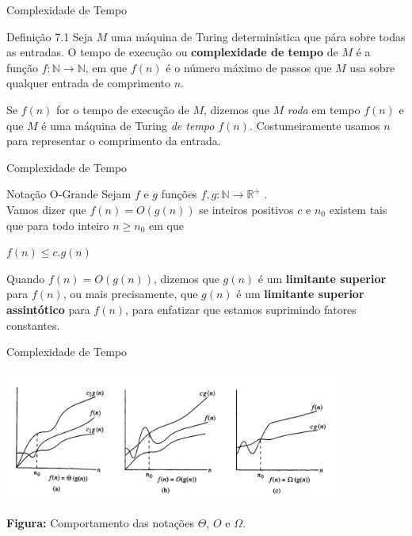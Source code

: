 \documentclass[xcolor=dvipsnames,table]{beamer}
\begin{document}
	\begin{frame}{Complexidade de Tempo}
		\begin{block}{Definição 7.1}
			Seja $M$ uma máquina de Turing determinística que pára sobre todas as entradas. O tempo de execução ou {\bf complexidade de tempo} de $M$ é a função $f : \mathbb{N} \rightarrow \mathbb{N}$, em que $f(n)$ é o número máximo de passos
			que $M$ usa sobre qualquer entrada de comprimento $n$.
			
			\vspace*{0.3cm}
			
			Se $f(n)$ for o tempo de execução de $M$, dizemos que $M$ {\it roda} em tempo $f(n)$ e que $M$ é uma máquina de Turing {\it de tempo} $f(n)$. Costumeiramente usamos $n$ para representar o comprimento da entrada.
		\end{block}
	\end{frame}
	
	\begin{frame}{Complexidade de Tempo}
		\begin{block}{Notação O-Grande}
			Sejam $f$ e $g$ funções $f,g:\mathbb{N} \rightarrow \mathbb{R}^+$ . \\Vamos dizer que $f(n) = O(g(n))$ se inteiros positivos $c$ e $n_0$ existem tais que para todo inteiro $n \geq n_0$ em que
			\begin{center}
				$f(n) \leq c.g(n)$			
			\end{center}
			Quando $f(n) = O(g(n))$, dizemos que $g(n)$ é um {\bf limitante superior} para $f(n)$, ou mais precisamente, que $g(n)$ é um {\bf limitante superior assintótico} para $f(n)$, para enfatizar que estamos suprimindo fatores constantes.
		\end{block}
	\end{frame}
	
	\begin{frame}{Complexidade de Tempo}
		\begin{center}
			\includegraphics[width=11cm]{images/crescimento.png}
			
			{\bf Figura:} Comportamento das notações $\Theta$, $O$ e $\Omega$.
		\end{center}
	\end{frame}	
	
\end{document}
